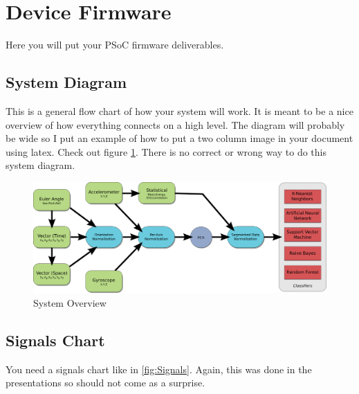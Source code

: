 \documentclass{sig-alternate-ipsn13}
\begin{document}

\section{Device Firmware} 
\label{sec:Firmware}

Here you will put your PSoC firmware deliverables.

\subsection{System Diagram}

This is a general flow chart of how your system will work. It is meant to be a nice overview of how everything connects on a high level. The diagram will probably be wide so I put an example of how to put a two column image in your document using latex. Check out figure \ref{fig:SystemOverview}. There is no correct or wrong way to do this system diagram. 

\begin{figure}[h!]
  \centering 
	\includegraphics[width=5.6in]{images/top.png}    
    \caption{System Overview}
    \label{fig:SystemOverview}
\end{figure}

\subsection{Signals Chart}

You need a signals chart like in \ref{fig:Signals}. Again, this was done in the presentations so should not come as a surprise.
\end{document}
